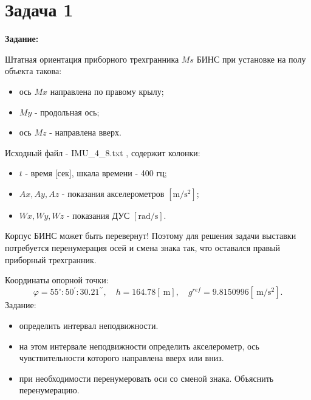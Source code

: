 \documentclass[a4paper,14pt]{article}
\theoremstyle{plain} %
\theoremstyle{definition} %
\theoremstyle{remark} %
\begin{document}
\thispagestyle{empty} %
\normalsize{
\newpage
\tableofcontents
\newpage

\section{Задача 1}
\textbf{Задание:}

Штатная ориентация приборного трехгранника $M s$ БИНС при установке на полу объекта такова:

\begin{itemize}
    \item ось $M x$ направлена по правому крылу;

    \item $M y$ - продольная ось;

    \item ось $M z$ - направлена вверх.

\end{itemize}
Исходный файл - IMU\_4\_8.txt , содержит колонки:

\begin{itemize}
    \item $t$ - время [сек], шкала времени - 400 гц;

    \item $A x, A y, A z$ - показания акселерометров $\left[\mathrm{m} / \mathrm{s}^{2}\right]$;

    \item $W x, W y, W z$ - показания ДУС $[\mathrm{rad} / \mathrm{s}]$.

\end{itemize}
Корпус БИНС может быть перевернут! Поэтому для решения задачи выставки потребуется перенумерация осей и смена знака так, что оставался правый приборный трехгранник.

Координаты опорной точки:
$$
    \varphi=55^{\circ}: 50^{\prime}: 30.21^{\prime \prime}, \quad h=164.78[\mathrm{~m}], \quad g^{r e f}=9.8150996\left[\mathrm{~m} / \mathrm{s}^{2}\right] .
$$
Задание:

\begin{itemize}
    \item определить интервал неподвижности.

    \item на этом интервале неподвижности определить акселерометр, ось чувствительности которого направлена вверх или вниз.

    \item при необходимости перенумеровать оси со сменой знака. Объяснить перенумерацию.


\end{itemize}}
\end{document}
